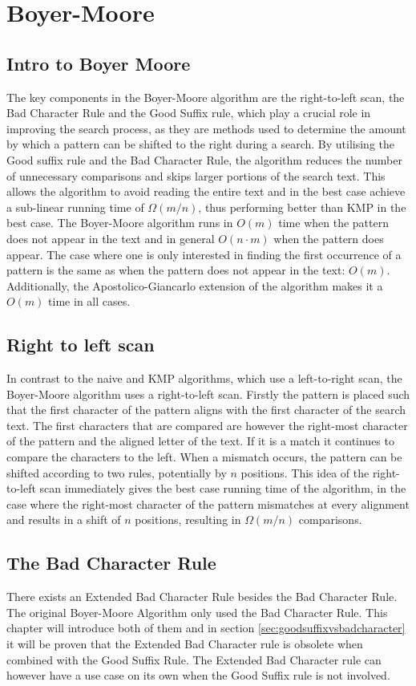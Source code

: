 
\section{Boyer-Moore}

\subsection{Intro to Boyer Moore}
The key components in the Boyer-Moore algorithm are the right-to-left scan, the Bad Character Rule and the Good Suffix rule, which play a crucial role in improving the search process, as they are methods used to determine the amount by which a pattern can be shifted to the right during a search. By utilising the Good suffix rule and the Bad Character Rule, the algorithm reduces the number of unnecessary comparisons and skips larger portions of the search text. This allows the algorithm to avoid reading the entire text and in the best case achieve a sub-linear running time of $\Omega(m/n)$, thus performing better than KMP in the best case. The Boyer-Moore algorithm runs in $O(m)$ time when the pattern does not appear in the text and in general $O(n\cdot m)$ when the pattern does appear. The case where one is only interested in finding the first occurrence of a pattern is the same as when the pattern does not appear in the text: $O(m)$. Additionally, the Apostolico-Giancarlo extension of the algorithm makes it a $O(m)$ time in all cases. 

\subsection{Right to left scan}
In contrast to the naive and KMP algorithms, which use a left-to-right scan, the Boyer-Moore algorithm uses a right-to-left scan. Firstly the pattern is placed such that the first character of the pattern aligns with the first character of the search text. The first characters that are compared are however the right-most character of the pattern and the aligned letter of the text. If it is a match it continues to compare the characters to the left. When a mismatch occurs, the pattern can be shifted according to two rules, potentially by $n$ positions. This idea of the right-to-left scan immediately gives the best case running time of the algorithm, in the case where the right-most character of the pattern mismatches at every alignment and results in a shift of $n$ positions, resulting in $\Omega(m/n)$ comparisons. 

\subsection{The Bad Character Rule}
There exists an Extended Bad Character Rule besides the Bad Character Rule. The original Boyer-Moore Algorithm only used the Bad Character Rule. This chapter will introduce both of them and in section \ref{sec:goodsuffixvsbadcharacter} it will be proven that the Extended Bad Character rule is obsolete when combined with the Good Suffix Rule. The Extended Bad Character rule can however have a use case on its own when the Good Suffix rule is not involved. 

